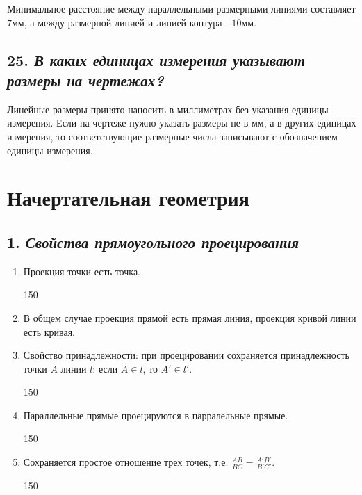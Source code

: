 Минимальное расстояние между параллельными размерными линиями составляет $7$мм, а между размерной линией и линией контура - $10$мм.
\subsection*{25. \textit{В каких единицах измерения указывают размеры на чертежах?}}

Линейные размеры принято наносить в миллиметрах без указания единицы измерения. Если на чертеже нужно указать размеры не в мм, а в других единицах измерения, то соответствующие размерные числа записывают с обозначением единицы измерения.

\newpage

\section*{Начертательная геометрия}


\subsection*{1. \textit{Свойства прямоугольного проецирования}}

\begin{mainQuote}
    
\end{mainQuote}

\begin{enumerate}
    \item Проекция точки есть точка.%

     {150}

    \item В общем случае проекция прямой есть прямая линия, проекция кривой линии есть кривая.

    \item Свойство принадлежности: при проецировании сохраняется принадлежность точки $A$ линии $l$: если $A \in l$, то $A' \in l'$.

     {150}

    \item Параллельные прямые проецируются в парралельные прямые.

     {150}
    \item Сохраняется простое отношение трех точек, т.е. {\Large $\frac{AB}{BC} = \frac{A'B'}{B'C'}$}.

     {150}

\end{enumerate}


